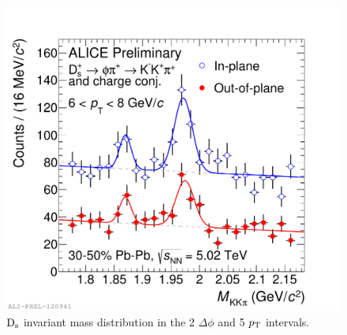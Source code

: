 \begin{figure}
\centering
 \includegraphics[width=.7\textwidth]{FigCap5/MassDsInOutOfPlane_PbPb3050_5TeV_pt6-8.pdf}
\caption{${\rm D_s}$ invariant mass distribution in the 2 $\Delta\phi$ and 5 $p_{\rm T}$ intervals.}
\label{fig:2deltaphibinsds}
\end{figure}

